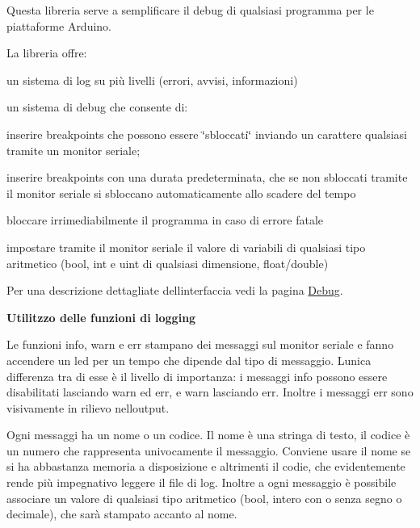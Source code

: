 Questa libreria serve a semplificare il debug di qualsiasi programma per le piattaforme Arduino.

La libreria offre\+:


\begin{DoxyItemize}
\item un sistema di log su più livelli (errori, avvisi, informazioni)
\item un sistema di debug che consente di\+:
\begin{DoxyItemize}
\item inserire breakpoints che possono essere \char`\"{}sbloccati\char`\"{} inviando un carattere qualsiasi tramite un monitor seriale;
\item inserire breakpoints con una durata predeterminata, che se non sbloccati tramite il monitor seriale si sbloccano automaticamente allo scadere del tempo
\item bloccare irrimediabilmente il programma in caso di errore fatale
\item impostare tramite il monitor seriale il valore di variabili di qualsiasi tipo aritmetico (bool, int e uint di qualsiasi dimensione, float/double)
\end{DoxyItemize}
\end{DoxyItemize}

Per una descrizione dettagliate dell\textquotesingle{}interfaccia vedi la pagina \hyperlink{class_debug}{Debug}. 



{\bfseries Utilitzzo delle funzioni di logging}

Le funzioni {\ttfamily info}, {\ttfamily warn} e {\ttfamily err} stampano dei messaggi sul monitor seriale e fanno accendere un led per un tempo che dipende dal tipo di messaggio. L\textquotesingle{}unica differenza tra di esse è il livello di importanza\+: i messaggi info possono essere disabilitati lasciando warn ed err, e warn lasciando err. Inoltre i messaggi err sono visivamente in rilievo nell\textquotesingle{}output.

Ogni messaggi ha un nome o un codice. Il nome è una stringa di testo, il codice è un numero che rappresenta univocamente il messaggio. Conviene usare il nome se si ha abbastanza memoria a disposizione e altrimenti il codie, che evidentemente rende più impegnativo leggere il file di log. Inoltre a ogni messaggio è possibile associare un valore di qualsiasi tipo aritmetico (bool, intero con o senza segno o decimale), che sarà stampato accanto al nome.

